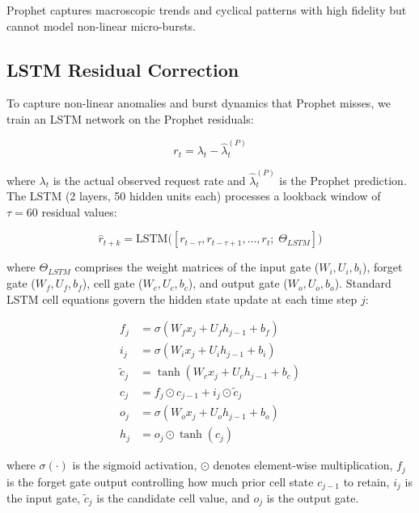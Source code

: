 \documentclass[conference]{IEEEtran}
\begin{document}
Prophet captures macroscopic trends and cyclical patterns with high fidelity but cannot model non-linear micro-bursts.

\subsection{LSTM Residual Correction}

To capture non-linear anomalies and burst dynamics that Prophet misses, we train an LSTM network on the Prophet residuals:

\begin{equation}
\label{eq:residual}
r_t = \lambda_t - \hat{\lambda}^{(P)}_t
\end{equation}

\noindent where $\lambda_t$ is the actual observed request rate and $\hat{\lambda}^{(P)}_t$ is the Prophet prediction. The LSTM (2 layers, 50 hidden units each) processes a lookback window of $\tau = 60$ residual values:

\begin{equation}
\label{eq:lstm}
\hat{r}_{t+k} = \text{LSTM}\!\bigl([r_{t-\tau}, r_{t-\tau+1}, \ldots, r_t;\; \Theta_{LSTM}]\bigr)
\end{equation}

\noindent where $\Theta_{LSTM}$ comprises the weight matrices of the input gate ($W_i, U_i, b_i$), forget gate ($W_f, U_f, b_f$), cell gate ($W_c, U_c, b_c$), and output gate ($W_o, U_o, b_o$). Standard LSTM cell equations govern the hidden state update at each time step $j$:

\begin{align}
f_j &= \sigma(W_f x_j + U_f h_{j-1} + b_f) \label{eq:forget}\\
i_j &= \sigma(W_i x_j + U_i h_{j-1} + b_i) \label{eq:input}\\
\tilde{c}_j &= \tanh(W_c x_j + U_c h_{j-1} + b_c) \label{eq:cell_candidate}\\
c_j &= f_j \odot c_{j-1} + i_j \odot \tilde{c}_j \label{eq:cell}\\
o_j &= \sigma(W_o x_j + U_o h_{j-1} + b_o) \label{eq:output}\\
h_j &= o_j \odot \tanh(c_j) \label{eq:hidden}
\end{align}

\noindent where $\sigma(\cdot)$ is the sigmoid activation, $\odot$ denotes element-wise multiplication, $f_j$ is the forget gate output controlling how much prior cell state $c_{j-1}$ to retain, $i_j$ is the input gate, $\tilde{c}_j$ is the candidate cell value, and $o_j$ is the output gate.
\end{document}
